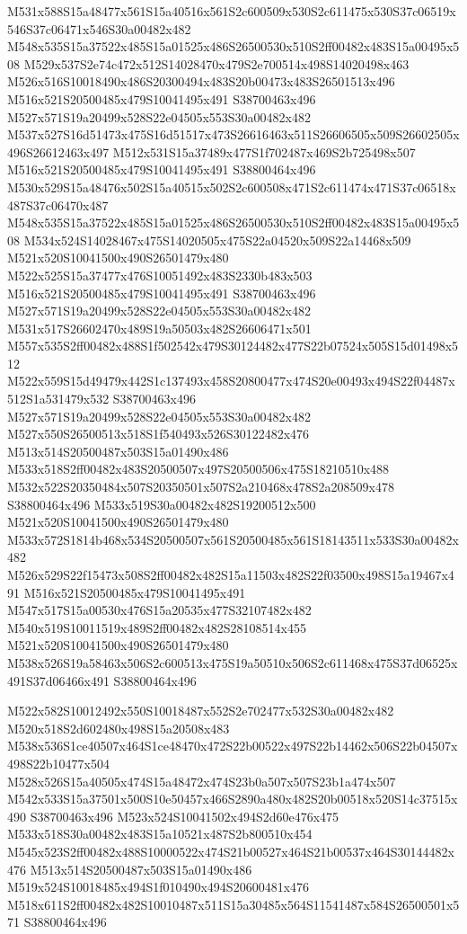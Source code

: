 \documentclass{article}
\begin{document}
\begin{multicols}{2}
M531x588S15a48477x561S15a40516x561S2c600509x530S2c611475x530S37c06519x546S37c06471x546S30a00482x482 M548x535S15a37522x485S15a01525x486S26500530x510S2ff00482x483S15a00495x508 M529x537S2e74c472x512S14028470x479S2e700514x498S14020498x463 M526x516S10018490x486S20300494x483S20b00473x483S26501513x496 M516x521S20500485x479S10041495x491 S38700463x496 M527x571S19a20499x528S22e04505x553S30a00482x482 M537x527S16d51473x475S16d51517x473S26616463x511S26606505x509S26602505x496S26612463x497 M512x531S15a37489x477S1f702487x469S2b725498x507 M516x521S20500485x479S10041495x491 S38800464x496 M530x529S15a48476x502S15a40515x502S2c600508x471S2c611474x471S37c06518x487S37c06470x487 M548x535S15a37522x485S15a01525x486S26500530x510S2ff00482x483S15a00495x508 M534x524S14028467x475S14020505x475S22a04520x509S22a14468x509 M521x520S10041500x490S26501479x480 M522x525S15a37477x476S10051492x483S2330b483x503 M516x521S20500485x479S10041495x491 S38700463x496 M527x571S19a20499x528S22e04505x553S30a00482x482 M531x517S26602470x489S19a50503x482S26606471x501 M557x535S2ff00482x488S1f502542x479S30124482x477S22b07524x505S15d01498x512 M522x559S15d49479x442S1c137493x458S20800477x474S20e00493x494S22f04487x512S1a531479x532 S38700463x496 M527x571S19a20499x528S22e04505x553S30a00482x482 M527x550S26500513x518S1f540493x526S30122482x476 M513x514S20500487x503S15a01490x486 M533x518S2ff00482x483S20500507x497S20500506x475S18210510x488 M532x522S20350484x507S20350501x507S2a210468x478S2a208509x478 S38800464x496 M533x519S30a00482x482S19200512x500 M521x520S10041500x490S26501479x480 M533x572S1814b468x534S20500507x561S20500485x561S18143511x533S30a00482x482 M526x529S22f15473x508S2ff00482x482S15a11503x482S22f03500x498S15a19467x491 M516x521S20500485x479S10041495x491 M547x517S15a00530x476S15a20535x477S32107482x482 M540x519S10011519x489S2ff00482x482S28108514x455 M521x520S10041500x490S26501479x480 M538x526S19a58463x506S2c600513x475S19a50510x506S2c611468x475S37d06525x491S37d06466x491 S38800464x496

M522x582S10012492x550S10018487x552S2e702477x532S30a00482x482 M520x518S2d602480x498S15a20508x483 M538x536S1ce40507x464S1ce48470x472S22b00522x497S22b14462x506S22b04507x498S22b10477x504 M528x526S15a40505x474S15a48472x474S23b0a507x507S23b1a474x507 M542x533S15a37501x500S10e50457x466S2890a480x482S20b00518x520S14c37515x490 S38700463x496 M523x524S10041502x494S2d60e476x475 M533x518S30a00482x483S15a10521x487S2b800510x454 M545x523S2ff00482x488S10000522x474S21b00527x464S21b00537x464S30144482x476 M513x514S20500487x503S15a01490x486 M519x524S10018485x494S1f010490x494S20600481x476 M518x611S2ff00482x482S10010487x511S15a30485x564S11541487x584S26500501x571 S38800464x496


\end{multicols}
\end{document}
